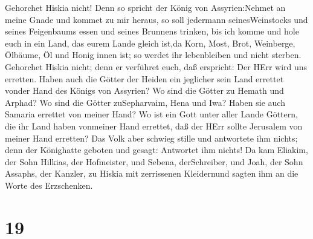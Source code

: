 Gehorchet Hiskia nicht! Denn so spricht der König von Assyrien:Nehmet an
meine Gnade und kommet zu mir heraus, so soll jedermann seinesWeinstocks
und seines Feigenbaums essen und seines Brunnens trinken, 
bis ich komme und hole euch in ein Land, das eurem Lande gleich ist,da
Korn, Most, Brot, Weinberge, Ölbäume, Öl und Honig innen ist; so werdet
ihr lebenbleiben und nicht sterben. Gehorchet Hiskia nicht; denn er
verführet euch, daß erspricht: Der HErr wird uns erretten. 
Haben auch die Götter der Heiden ein jeglicher sein Land errettet vonder
Hand des Königs von Assyrien?  Wo sind die Götter zu Hemath
und Arphad? Wo sind die Götter zuSepharvaim, Hena und Iwa? Haben sie
auch Samaria errettet von meiner Hand?  Wo ist ein Gott
unter aller Lande Göttern, die ihr Land haben vonmeiner Hand errettet,
daß der HErr sollte Jerusalem von meiner Hand erretten? 
Das Volk aber schwieg stille und antwortete ihm nichts; denn der
Könighatte geboten und gesagt: Antwortet ihm nichts!  Da
kam Eliakim, der Sohn Hilkias, der Hofmeister, und Sebena, derSchreiber,
und Joah, der Sohn Assaphs, der Kanzler, zu Hiskia mit zerrissenen
Kleidernund sagten ihm an die Worte des Erzschenken.

\hypertarget{section-18}{%
\section{19}\label{section-18}}

